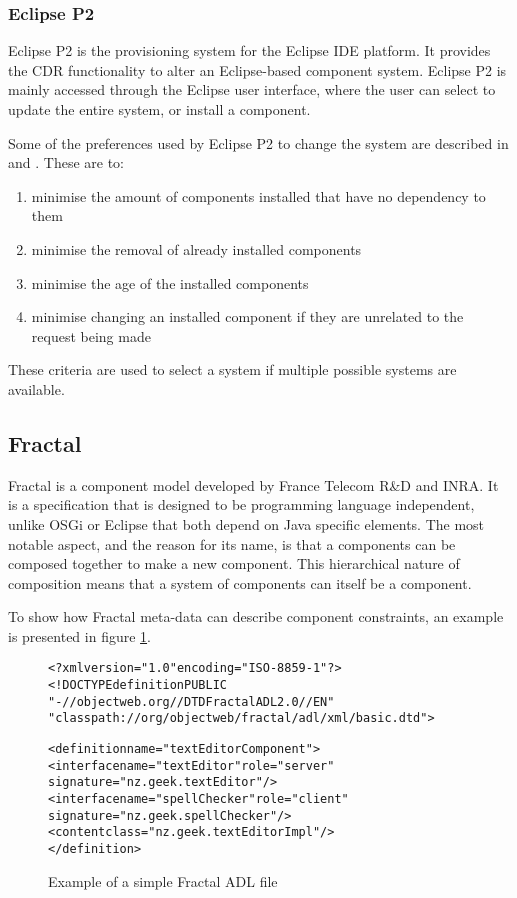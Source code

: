 \subsubsection{Eclipse P2}
Eclipse P2 \citep{le_berre_dependency_2009,leBerre2010} is the provisioning system for the Eclipse IDE platform.
It provides the CDR functionality to alter an Eclipse-based component system. 
Eclipse P2 is mainly accessed through the Eclipse user interface, where the user can select to update the entire system, or install a component.

Some of the preferences used by Eclipse P2 to change the system are described in \citep{le_berre_dependency_2009} and \citep{leBerre2010}.
These are to:
\begin{enumerate}
  \item minimise the amount of components installed that have no dependency to them 
  \item minimise the removal of already installed components
  \item minimise the age of the installed components
  \item minimise changing an installed component if they are unrelated to the request being made
\end{enumerate} 

These criteria are used to select a system if multiple possible systems are available. 

\subsection{Fractal}
Fractal \citep{Quma2006} is a component model developed by France Telecom R\&D and INRA.
It is a specification that is designed to be programming language independent, unlike OSGi or Eclipse that both depend on Java specific elements.
The most notable aspect, and the reason for its name, is that a components can be composed together to make a new component.
This hierarchical nature of composition means that a system of components can itself be a component.

To show how Fractal meta-data can describe component constraints, an example is presented in figure \ref{fractalmetadata}.

\begin{figure}[htp]
\begin{center}
\begin{alltt}
<?xml version="1.0" encoding="ISO-8859-1" ?>
<!DOCTYPE definition PUBLIC 
    "-//objectweb.org//DTD Fractal ADL 2.0//EN" 
    "classpath://org/objectweb/fractal/adl/xml/basic.dtd">

<definition name="textEditorComponent">
  <interface name="textEditor" role = "server" 
   signature = "nz.geek.textEditor"/>
  <interface name="spellChecker" role = "client" 
   signature = "nz.geek.spellChecker"/>
  <content class="nz.geek.textEditorImpl"/>
</definition>
\end{alltt}
  \caption{Example of a simple Fractal ADL file}
  \label{fractalmetadata}
\end{center}
\end{figure}

